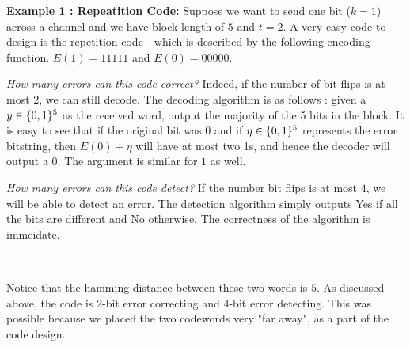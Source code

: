 \begin{description}
\item{\bf Example 1 : Repeatition Code:} 
Suppose we want to send one bit ($k=1$) across a channel and we have block length of $5$ and $t=2$. A very easy code to design is the repetition code - which is described by the following encoding function. $E(1) = 11111$ and $E(0) = 00000$.

\textit{How many errors can this code correct?} Indeed, if the number of bit flips is at most $2$, we can still decode. The decoding algorithm is as follows : given a $y \in \{0,1\}^5$ as the received word, output the majority of the 5 bits in the block. It is easy to see that if the original bit was $0$ and if $\eta \in \{0,1\}^5$ represents the error bitstring, then $E(0)+\eta$ will have at most two 1s, and hence the decoder will output a $0$. The argument is similar for $1$ as well. 

\textit{How many errors can this code detect?} If the number bit flips is at most $4$, we will be able to detect an error. The detection algorithm simply outputs {\sc Yes} if all the bits are different and {\sc No} otherwise. The correctness of the algorithm is immeidate.

\begin{minipage}{0.03\linewidth}
~~
\end{minipage}
\hspace{-6mm}\begin{minipage}{0.57\linewidth}
Notice that the hamming distance between these two words is $5$. As discussed above, the code is $2$-bit error correcting and $4$-bit error detecting. This was possible because we placed the two codewords very "far away", as a part of the code design.
\end{minipage}
\begin{minipage}{0.04\linewidth}
~~
\end{minipage}
\begin{minipage}{0.3\linewidth}
\vspace{1mm}
\end{minipage}


\end{description}
